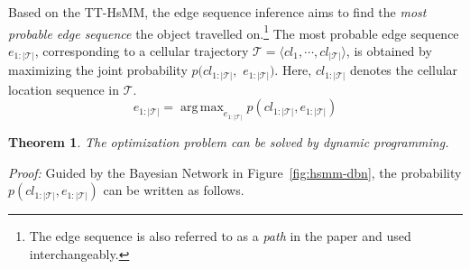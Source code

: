 \documentclass{vldb}
\DeclareMathOperator*{\argmax}{arg\,max}
\newtheorem{theorem}{Theorem}
\begin{document}
	Based on the TT-HsMM, the edge sequence inference aims to find the {\em most probable edge sequence} the object travelled on.\footnote{The edge sequence is also referred to as a {\em path} in the paper and used interchangeably.} 
	The most probable edge sequence $e_{1:|\mathcal{T}|}$, corresponding to a cellular trajectory $\mathcal{T}=\langle cl_1,\cdots,cl_{|\mathcal{T}|}\rangle$,  is obtained by maximizing the joint probability $p(cl_{1:|\mathcal{T}|},$ $e_{1:|\mathcal{T}|})$. 
	Here, $cl_{1:|\mathcal{T}|}$ denotes the cellular location sequence in $\mathcal{T}$. 
	\begin{equation}
	e_{1:|\mathcal{T}|}=\argmax_{e_{1:|\mathcal{T}|}} p(cl_{1:|\mathcal{T}|}, e_{1:|\mathcal{T}|})
	\end{equation}
	\begin{theorem}
		\label{th:most-prob}
		The optimization problem can be solved by dynamic programming.
	\end{theorem}
	\textit{Proof:  } Guided by the Bayesian Network in Figure~\ref{fig:hsmm-dbn}, the probability $p(cl_{1:|\mathcal{T}|}, e_{1:|\mathcal{T}|})$ can be written as follows.
\end{document}
